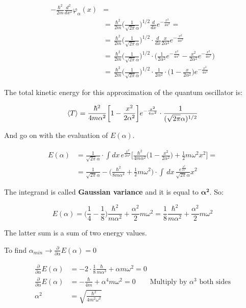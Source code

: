 		\begin{align*}
			-\frac{\hbar^2}{2m}\frac{d^2}{dx^2}\varphi_{\alpha}(x)&=\\
			&=\,\frac{\hbar^2}{2m}\bigg(\frac{1}{\sqrt{2\pi}\alpha}\bigg)^{1/2}\frac{d}{dx}e^{-{\frac{x^2}{4\alpha^2}}}=\\
			&=\,\frac{\hbar^2}{2m}\bigg(\frac{1}{\sqrt{2\pi}\alpha}\bigg)^{1/2}\cdot\frac{d}{dx}\frac{x}{2\alpha^2}e^{-{\frac{x^2}{4\alpha^2}}}\\
			&=\,\frac{\hbar^2}{2m}\bigg(\frac{1}{\sqrt{2\pi}\alpha}\bigg)^{1/2}\cdot\bigg(\frac{1}{2\alpha^2}e^{-{\frac{x^2}{4\alpha^2}}}-\frac{x^2}{2\alpha^2}e^{-\frac{x^2}{4\alpha^2}}\bigg)\\
			&=\,\frac{\hbar^2}{2m}\bigg(\frac{1}{\sqrt{2\pi}\alpha}\bigg)^{1/2}\cdot\frac{1}{2\alpha^2}\cdot\bigg(1-\frac{x}{2\alpha^2}\bigg)e^{-{\frac{x^2}{4\alpha^2}}}
		\end{align*}

		The total kinetic energy for this approximation of the quantum oscillator is:

		$$\expval{T}=\frac{\hbar^2}{4m\alpha^2}\bigg[1-\frac{x^2}{2\alpha^2}\bigg]e^{-{\frac{x^2}{4\alpha^2}}}\cdot\frac{1}{(\sqrt{2\pi}\alpha)^{1/2}}$$

		And go on with the evaluation of $E(\alpha)$.

		\begin{align*}
			E(\alpha)&=\frac{1}{\sqrt{2\pi}\alpha}\cdot \int dx\, e^{\frac{x^2}{2\alpha^2}}\bigg[\frac{\hbar^2}{4m\alpha^2}\bigg(1-\frac{x^2}{2\alpha^2}\bigg)+\frac{1}{2}m\omega^2x^2\bigg]=\\
					 		&=\frac{1}{\sqrt{2\pi}\alpha}-\bigg(\frac{\hbar^2}{8m\alpha^4}+\frac{1}{2}m\omega^2\bigg)\cdot \int\,dx\,\frac{e^{\frac{x^2}{2\alpha^2}}}{\sqrt{2\pi}\alpha}x^2
		\end{align*}

		The integrand is called \textbf{Gaussian variance} and it is equal to $\mathbf{\alpha^2}$.
		So:

		$$E(\alpha)=\bigg(\frac{1}{4}-\frac{1}{8}\bigg)\frac{\hbar^2}{m\alpha^2}+\frac{\alpha^2}{2}m\omega^2 = \frac{1}{8}\frac{\hbar^2}{m\alpha^2}+\frac{\alpha^2}{2}m\omega^2$$

		The latter sum is a sum of two energy values.

		To find $\alpha_{min}\rightarrow\frac{\partial}{\partial \alpha}E(\alpha)=0$

		\begin{align*}
			\frac{\partial}{\partial \alpha}E(\alpha)&=-2\cdot\frac{1}{8}\frac{\hbar}{m\alpha^{3}}+\alpha m\omega^2=0\\
			\frac{\partial}{\partial \alpha}E(\alpha)&=-\frac{\hbar}{4m}+\alpha^4m\omega^2=0\qquad\text{Multiply by }\alpha^3\text{ both sides}\\
			\alpha^2&=\sqrt{\frac{\hbar^2}{4m^2\omega^2}}
		\end{align*}

